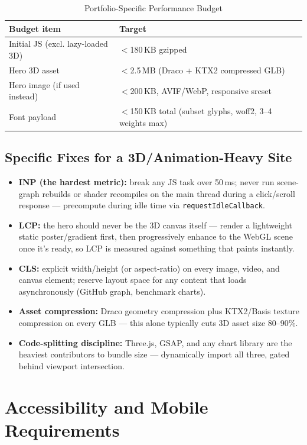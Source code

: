 \documentclass[conference]{IEEEtran}
\begin{document}
\begin{table}[h]
\centering
\caption{Portfolio-Specific Performance Budget}
\label{tab:perfbudget_full}
\begin{tabular}{L{2.6cm}L{4.4cm}}
\toprule
\textbf{Budget item} & \textbf{Target} \\
\midrule
Initial JS (excl. lazy-loaded 3D) & $<$180\,KB gzipped \\
Hero 3D asset & $<$2.5\,MB (Draco + KTX2 compressed GLB) \\
Hero image (if used instead) & $<$200\,KB, AVIF/WebP, responsive srcset \\
Font payload & $<$150\,KB total (subset glyphs, woff2, 3--4 weights max) \\
\bottomrule
\end{tabular}
\end{table}

\subsection{Specific Fixes for a 3D/Animation-Heavy Site}
\begin{itemize}[leftmargin=*]
\item \textbf{INP (the hardest metric):} break any JS task over 50\,ms; never run scene-graph rebuilds or shader recompiles on the main thread during a click/scroll response --- precompute during idle time via \texttt{requestIdleCallback}.
\item \textbf{LCP:} the hero should never be the 3D canvas itself --- render a lightweight static poster/gradient first, then progressively enhance to the WebGL scene once it's ready, so LCP is measured against something that paints instantly.
\item \textbf{CLS:} explicit width/height (or aspect-ratio) on every image, video, and canvas element; reserve layout space for any content that loads asynchronously (GitHub graph, benchmark charts).
\item \textbf{Asset compression:} Draco geometry compression plus KTX2/Basis texture compression on every GLB --- this alone typically cuts 3D asset size 80--90\%.
\item \textbf{Code-splitting discipline:} Three.js, GSAP, and any chart library are the heaviest contributors to bundle size --- dynamically import all three, gated behind viewport intersection.
\end{itemize}

\section{Accessibility and Mobile Requirements}
\end{document}
